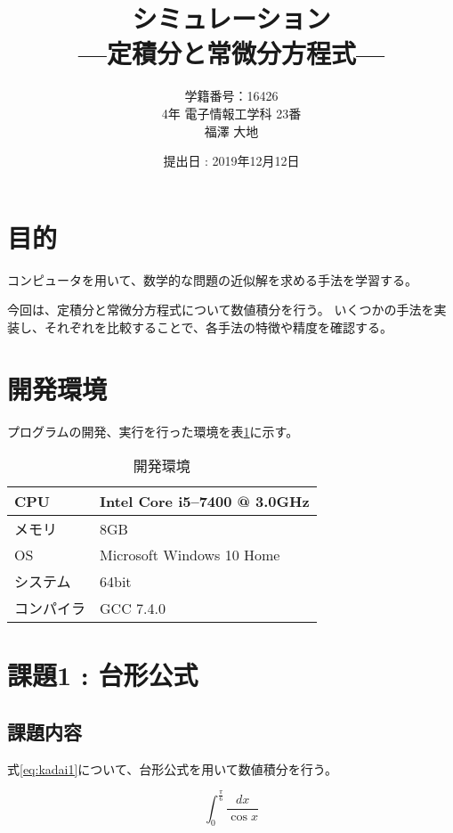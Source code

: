 \documentclass[a4j,titlepage]{jsarticle}
\begin{document}
\begin{titlepage}
  \title{\huge{シミュレーション} \\ \LARGE{---定積分と常微分方程式---}}
	\author{学籍番号：16426 \\ 4年 電子情報工学科 23番 \\ 福澤 大地}
	\date{提出日 : 2019年12月12日}
  \maketitle
\end{titlepage}


\section{目的}
コンピュータを用いて、数学的な問題の近似解を求める手法を学習する。

今回は、定積分と常微分方程式について数値積分を行う。
いくつかの手法を実装し、それぞれを比較することで、各手法の特徴や精度を確認する。


\section{開発環境}
プログラムの開発、実行を行った環境を表\ref{tb:kan}に示す。

\begin{table}[H]
  \centering
  \caption{開発環境}
  \label{tb:kan}

  \begin{tabular}{|l|l|}
    \hline
    CPU & Intel Core i5--7400 @ 3.0GHz \\ \hline
    メモリ & 8GB \\ \hline
    OS & Microsoft Windows 10 Home \\ \hline
    システム & 64bit \\ \hline
    コンパイラ & GCC 7.4.0 \\ \hline
  \end{tabular}
\end{table}


\section{課題1 : 台形公式}
\subsection{課題内容}
式\ref{eq:kadai1}について、台形公式を用いて数値積分を行う。

\begin{equation}
  \int_0^\frac{\pi}{6} \frac{dx}{\cos x}
  \label{eq:kadai1}
\end{equation}
\end{document}
